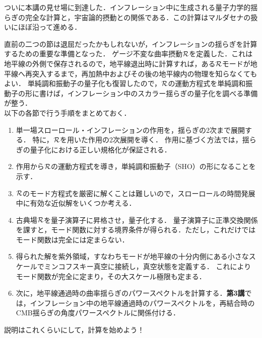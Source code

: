 \label{sec:full}

ついに本講の見せ場に到達した．インフレーション中に生成される量子力学的揺らぎの完全な計算と，宇宙論的摂動との関係である．この計算はマルダセナの扱い\cite{malda}にほぼ沿って進める．



直前の二つの節は退屈だったかもしれないが，インフレーションの揺らぎを計算するための重要な準備となった．
ゲージ不変な曲率摂動${\cal R}$を定義した．これは地平線の外側で保存されるので，地平線退出時に計算すれば，ある${\cal R}$モードが地平線へ再突入するまで，再加熱中およびその後の地平線内の物理を知らなくてもよい．
単純調和振動子の量子化も復習したので，${\cal R}$の運動方程式を単純調和振動子の形に書けば，インフレーション中のスカラー揺らぎの量子化を調べる準備が整う．\\

以下の各節で行う手順をまとめておく．

\begin{enumerate}
\item 単一場スローロール・インフレーションの作用を，揺らぎの2次まで展開する．
特に，${\cal R}$を用いた作用の2次展開を導く．
作用に基づく方法では，揺らぎの量子化における正しい規格化が保証される．
\item 作用から${\cal R}$の運動方程式を導き，単純調和振動子（SHO）の形になることを示す．
\item ${\cal R}$のモード方程式を厳密に解くことは難しいので，スローロールの時間発展中に有効な近似解をいくつか考える．
\item 古典場${\cal R}$を量子演算子に昇格させ，量子化する．
量子演算子に正準交換関係を課すと，モード関数に対する境界条件が得られる．ただし，これだけではモード関数は完全には定まらない．
\item 得られた解を紫外領域，すなわちモードが地平線の十分内側にある小さなスケールでミンコフスキー真空に接続し，真空状態を定義する．
これによりモード関数が完全に定まり，その大スケール極限も定まる．
\item 次に，地平線通過時の曲率揺らぎのパワースペクトルを計算する．{\bf 第3講}では，インフレーション中の地平線通過時のパワースペクトルを，再結合時のCMB揺らぎの角度パワースペクトルに関係付ける．
\end{enumerate}

\noindent
説明はこれくらいにして，計算を始めよう！


